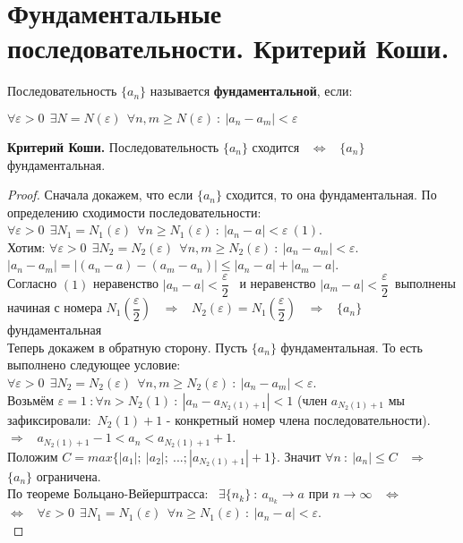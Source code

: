 \documentclass[12pt]{article}
\begin{document}
\section{Фундаментальные последовательности. Критерий Коши.}
Последовательность $\{a_n\}$ называется \textbf{фундаментальной}, если:
\begin{center}
    $\forall \varepsilon > 0 \ \ \exists N = N(\varepsilon)  \ \ \forall n, m \geq N(\varepsilon) \ : \ |a_n - a_m| < \varepsilon$ 
\end{center}
\textbf{Критерий Коши.} Последовательность $\{a_n\}$ сходится \ $\Leftrightarrow$ \  $\{a_n\}$ фундаментальная.
\begin{proof}
    Сначала докажем, что если $\{a_n\}$ сходится, то она фундаментальная. По определению сходимости последовательности: $\forall \varepsilon > 0 \ \ \exists N_1 = N_1(\varepsilon) \ \ \forall n \geq N_1(\varepsilon) \ : \ |a_n - a| < \varepsilon \ (1)$. \\
    Хотим: $\forall \varepsilon > 0 \ \ \exists N_2 = N_2(\varepsilon) \ \ \forall n, m \geq N_2(\varepsilon) \ : \ |a_n - a_m| < \varepsilon$. \\
    $|a_n - a_m| = |(a_n - a) - (a_m - a_n)| \leq |a_n - a| + |a_m - a|$. \\ Согласно $(1)$ неравенство $|a_n - a| < \dfrac{\varepsilon}{2}$ \ и неравенство $|a_m - a| < \dfrac{\varepsilon}{2}$\ выполнены начиная с номера $N_1\left(\dfrac{\varepsilon}{2}\right)$ \ $\Rightarrow$ \ $N_2(\varepsilon) = N_1\left(\dfrac{\varepsilon}{2}\right)$  \ $\Rightarrow$ \ $\{a_n\}$ фундаментальная\\
    Теперь докажем в обратную сторону. Пусть $\{a_n\}$ фундаментальная. То есть выполнено следующее условие: $\forall \varepsilon > 0 \ \ \exists N_2 = N_2(\varepsilon) \ \ \forall n, m \geq N_2(\varepsilon) \ : \ |a_n - a_m| < \varepsilon$. \\
    Возьмём $\varepsilon = 1 \ : \forall n > N_2(1) \ : \ |a_n - a_{N_2(1)+1}| < 1$ (член $a_{N_2(1)+1}$ мы зафиксировали:\ $N_2(1)+1$ - конкретный номер члена последовательности). \ $\Rightarrow$ \ $a_{N_2(1)+1} - 1 < a_n < a_{N_2(1)+1} + 1$. \\
    Положим $C = max\{|a_1|; \ |a_2|; \ ...; |a_{N_2(1)+1}| + 1 \}$. Значит $\forall n \ : \ |a_n| \leq C$ \ $\Rightarrow$ \ $\{a_n\}$ ограничена.\\
    По теореме Больцано-Вейерштрасса: \ $\exists \{n_k\} \ : \ a_{n_k} \to a$ при $n \to \infty$ \ $\Leftrightarrow$ \\ $\Leftrightarrow$ \ $\forall \varepsilon > 0 \ \ \exists N_1 = N_1(\varepsilon) \ \ \forall n \geq N_1(\varepsilon) \ : \ |a_n - a| < \varepsilon$. \\

\end{proof}
\end{document}
